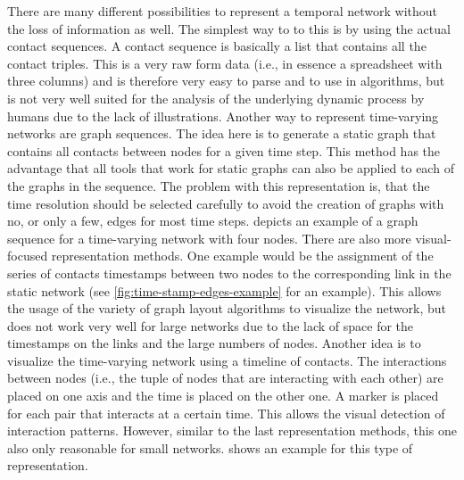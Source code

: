 There are many different possibilities to represent a temporal network without the loss of information as well.
The simplest way to to this is by using the actual contact sequences.
A contact sequence is basically a list that contains all the contact triples.
This is a very raw form data (i.e., in essence a spreadsheet with three columns) and is therefore very easy to parse and to use in algorithms, but is not very well suited for the analysis of the underlying dynamic process by humans due to the lack of illustrations.
Another way to represent time-varying networks are graph sequences.
The idea here is to generate a static graph that contains all contacts between nodes for a given time step.
This method has the advantage that all tools that work for static graphs can also be applied to each of the graphs in the sequence.
The problem with this representation is, that the time resolution should be selected carefully to avoid the creation of graphs with no, or only a few, edges for most time steps.
 depicts an example of a graph sequence for a time-varying network with four nodes.
There are also more visual-focused representation methods.
One example would be the assignment of the series of contacts timestamps between two nodes to the corresponding link in the static network (see \cref{fig:time-stamp-edges-example} for an example).
This allows the usage of the variety of graph layout algorithms to visualize the network, but does not work very well for large networks due to the lack of space for the timestamps on the links and the large numbers of nodes.
Another idea is to visualize the time-varying network using a timeline of contacts.
The interactions between nodes (i.e., the tuple of nodes that are interacting with each other) are placed on one axis and the time is placed on the other one.
A marker is placed for each pair that interacts at a certain time.
This allows the visual detection of interaction patterns.
However, similar to the last representation methods, this one also only reasonable for small networks.
 shows an example for this type of representation.

